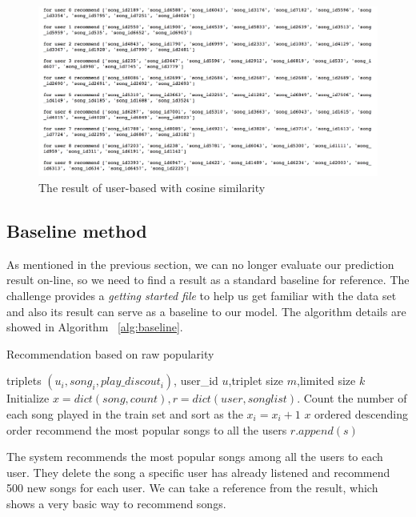 \documentclass{article}
\begin{document}
\begin{figure}[ht]
\vskip 0.2in
\begin{center}
\centerline{\includegraphics[width=\columnwidth]{test}}
\caption{The result of user-based with cosine similarity}
\label{fig:cf}
\end{center}
\vskip -0.2in
\end{figure}


\subsection{Baseline method}
As mentioned in the previous section, we can no longer evaluate our prediction result on-line, so we need to find a result as a standard baseline for reference. The challenge provides a \emph{getting started file} to help us get familiar with the data set and also its result can serve as a baseline to our model. The algorithm details are showed in Algorithm ~\ref{alg:baseline}. 

\begin{algorithm}[tb]
   \caption{Recommendation based on raw popularity}
   \label{alg:baseline}
\begin{algorithmic}
    triplets $(u_i,song_i,play\_discout_i)$, user\_id $u$,triplet size $m$,limited  size $k$
   \STATE Initialize $x = dict(song,count), r = dict(user,song list)$.
   \STATE Count the number of each song played in the train set and sort as the  
   \STATE $x_i=x_i+1$
   \ENDFOR
   \STATE $x$ ordered descending order
   \STATE recommend the most popular songs to all the users
   \STATE $r.append(s)$
   \ENDIF
   \ENDFOR
\end{algorithmic}
\end{algorithm}

The system recommends the most popular songs among all the users to each user. They delete the song a specific user has already listened and recommend 500 new songs for each user. We can take a reference from the result, which shows a very basic way to recommend songs.
\end{document}
